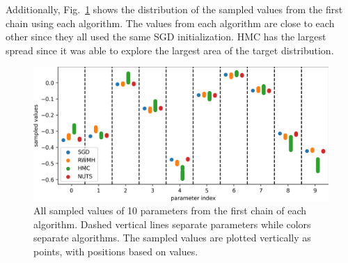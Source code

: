 \documentclass[12pt]{article}
\begin{document}
Additionally, Fig.\ \ref{fig_uci_param_distribution} shows the distribution of the sampled values from the first chain using each algorithm. The values from each algorithm are close to each other since they all used the same SGD initialization. HMC has the largest spread since it was able to explore the largest area of the target distribution.

\begin{figure}[H]
\centering
\includegraphics[width=15cm]{plots/uci_param_distribution.png}
\caption{All sampled values of 10 parameters from the first chain of each algorithm. Dashed vertical lines separate parameters while colors separate algorithms. The sampled values are plotted vertically as points, with positions based on values.}
\label{fig_uci_param_distribution}
\end{figure}
\end{document}
